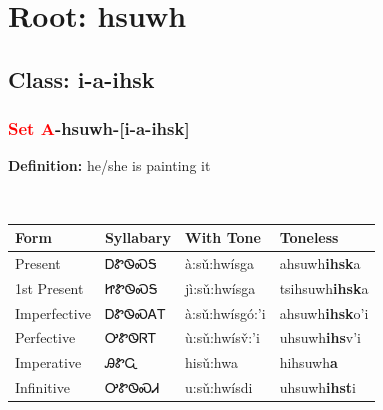 \needspace{4in}
\section*{Root: hsuwh}
\nopagebreak
{}
\needspace{3in}
\subsection*{Class: i-a-ihsk}
\nopagebreak
\needspace{2in}
\subsubsection*{\textcolor{Red}{Set A}{-}\textbf{hsuwh}{-}[i-a-ihsk]}
\nopagebreak
\textbf{Definition: } he/she is painting it
\\[0.5em]
\begin{tabularx}{\textwidth}{l X X X}%
\toprule%
\textbf{Form}&\textbf{Syllabary}&\textbf{With Tone}&\textbf{Toneless}\\%
\midrule%
Present&ᎠᏑᏫᏍᎦ&à:sǔ:hwísga&ahsuwh\textbf{ihsk}a\\%
1st Present&ᏥᏑᏫᏍᎦ&jì:sǔ:hwísga&tsihsuwh\textbf{ihsk}a\\%
Imperfective&ᎠᏑᏫᏍᎪᎢ&à:sǔ:hwísgó:’i&ahsuwh\textbf{ihsk}o'i\\%
Perfective&ᎤᏑᏫᏒᎢ&ù:sǔ:hwísv̌:’i&uhsuwh\textbf{ihs}v'i\\%
Imperative&ᎯᏑᏩ&hisǔ:hwa&hihsuwh\textbf{a}\\%
Infinitive&ᎤᏑᏫᏍᏗ&u:sǔ:hwísdi&uhsuwh\textbf{ihst}i\\%
\bottomrule%
\end{tabularx}
\\[1em]